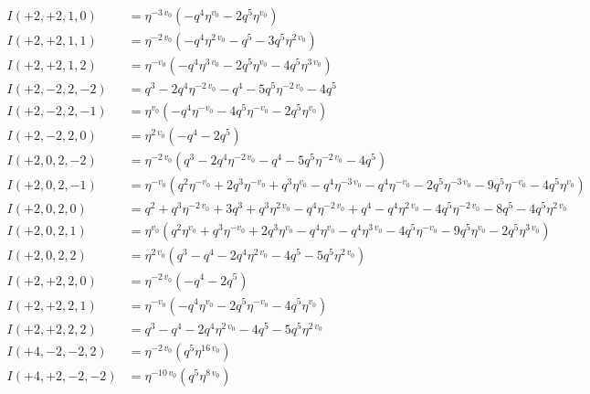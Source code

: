 \documentclass{article}
\begin{document}
\begin{align*}
I(+2, +2, 1, 0) &= \eta^{-3 \, v_{0}} \left( -q^{4} \eta^{v_{0}} - 2 q^{5} \eta^{v_{0}} \right) \\
I(+2, +2, 1, 1) &= \eta^{-2 \, v_{0}} \left( -q^{4} \eta^{2 \, v_{0}} - q^{5} - 3 q^{5} \eta^{2 \, v_{0}} \right) \\
I(+2, +2, 1, 2) &= \eta^{-v_{0}} \left( -q^{4} \eta^{3 \, v_{0}} - 2 q^{5} \eta^{v_{0}} - 4 q^{5} \eta^{3 \, v_{0}} \right) \\
I(+2, -2, 2, -2) &= q^{3} - 2 q^{4} \eta^{-2 \, v_{0}} - q^{4} - 5 q^{5} \eta^{-2 \, v_{0}} - 4 q^{5} \\
I(+2, -2, 2, -1) &= \eta^{v_{0}} \left( -q^{4} \eta^{-v_{0}} - 4 q^{5} \eta^{-v_{0}} - 2 q^{5} \eta^{v_{0}} \right) \\
I(+2, -2, 2, 0) &= \eta^{2 \, v_{0}} \left( -q^{4} - 2 q^{5} \right) \\
I(+2, 0, 2, -2) &= \eta^{-2 \, v_{0}} \left( q^{3} - 2 q^{4} \eta^{-2 \, v_{0}} - q^{4} - 5 q^{5} \eta^{-2 \, v_{0}} - 4 q^{5} \right) \\
I(+2, 0, 2, -1) &= \eta^{-v_{0}} \left( q^{2} \eta^{-v_{0}} + 2 q^{3} \eta^{-v_{0}} + q^{3} \eta^{v_{0}} - q^{4} \eta^{-3 \, v_{0}} - q^{4} \eta^{-v_{0}} - 2 q^{5} \eta^{-3 \, v_{0}} - 9 q^{5} \eta^{-v_{0}} - 4 q^{5} \eta^{v_{0}} \right) \\
I(+2, 0, 2, 0) &= q^{2} + q^{3} \eta^{-2 \, v_{0}} + 3 q^{3} + q^{3} \eta^{2 \, v_{0}} - q^{4} \eta^{-2 \, v_{0}} + q^{4} - q^{4} \eta^{2 \, v_{0}} - 4 q^{5} \eta^{-2 \, v_{0}} - 8 q^{5} - 4 q^{5} \eta^{2 \, v_{0}} \\
I(+2, 0, 2, 1) &= \eta^{v_{0}} \left( q^{2} \eta^{v_{0}} + q^{3} \eta^{-v_{0}} + 2 q^{3} \eta^{v_{0}} - q^{4} \eta^{v_{0}} - q^{4} \eta^{3 \, v_{0}} - 4 q^{5} \eta^{-v_{0}} - 9 q^{5} \eta^{v_{0}} - 2 q^{5} \eta^{3 \, v_{0}} \right) \\
I(+2, 0, 2, 2) &= \eta^{2 \, v_{0}} \left( q^{3} - q^{4} - 2 q^{4} \eta^{2 \, v_{0}} - 4 q^{5} - 5 q^{5} \eta^{2 \, v_{0}} \right) \\
I(+2, +2, 2, 0) &= \eta^{-2 \, v_{0}} \left( -q^{4} - 2 q^{5} \right) \\
I(+2, +2, 2, 1) &= \eta^{-v_{0}} \left( -q^{4} \eta^{v_{0}} - 2 q^{5} \eta^{-v_{0}} - 4 q^{5} \eta^{v_{0}} \right) \\
I(+2, +2, 2, 2) &= q^{3} - q^{4} - 2 q^{4} \eta^{2 \, v_{0}} - 4 q^{5} - 5 q^{5} \eta^{2 \, v_{0}} \\
I(+4, -2, -2, 2) &= \eta^{-2 \, v_{0}} \left( q^{5} \eta^{16 \, v_{0}} \right) \\
I(+4, +2, -2, -2) &= \eta^{-10 \, v_{0}} \left( q^{5} \eta^{8 \, v_{0}} \right) \\

\end{align*}
\end{document}
